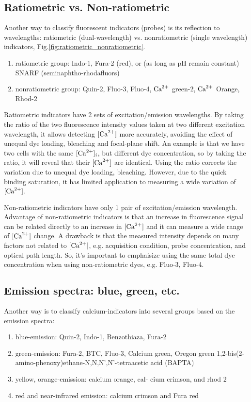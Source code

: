 \subsection{Ratiometric vs. Non-ratiometric}


Another way to classify fluorescent indicators (probes) is its reflection to
wavelengths: ratiometric (dual-wavelength) vs. nonratiometric (single
wavelength) indicators, Fig.\ref{fig:ratiometric_nonratiometric}.

\begin{enumerate}
  \item ratiometric group: Indo-1, Fura-2 (red),  or
  (as long as pH remain constant) SNARF (seminaphtho-rhodafluors)
  \item nonratiometric group: Quin-2, Fluo-3, Fluo-4, ${\text{Ca}^{2+}}$ green-2, ${\text{Ca}^{2+}}$
  Orange, Rhod-2
\end{enumerate}
Ratiometric indicators have 2 sets of excitation/emission wavelengths. By taking the ratio
of the two fluorescence intensity values taken at two different excitation
wavelength, it allows detecting $[{\text{Ca}^{2+}}]$ more accurately, avoiding the effect of
unequal dye loading, bleaching and focal-plane shift. An example is that we have
two cells with the same $[{\text{Ca}^{2+}}]_i$, but different dye concentration, so by taking
the ratio, it will reveal that their $[{\text{Ca}^{2+}}]$ are identical. Using the ratio
corrects the variation due to unequal dye loading, bleaching. However, due to
the quick binding saturation, it has limited application to measuring a wide
variation of $[{\text{Ca}^{2+}}]$.

Non-ratiometric indicators have only 1 pair of excitation/emission wavelength.
Advantage of non-ratiometric indicators is that an increase in fluorescence
signal can be related directly to an increase in $[{\text{Ca}^{2+}}]$ and it can measure a
wide range of $[{\text{Ca}^{2+}}]$ change. A drawback is that the measured intensity depends
on many factors not related to $[{\text{Ca}^{2+}}]$, e.g.
acquisition condition, probe concentration, and optical path length. So, it's
important to emphaisize using the same total dye concentration when using
non-ratiometric dyes, e.g. Fluo-3, Fluo-4.

\subsection{Emission spectra: blue, green, etc.}

Another way is to classify calcium-indicators into several groups
based on the emission spectra:
\begin{enumerate}
  \item blue-emission: Quin-2, Indo-1, Benzothiaza, Fura-2
  \item green-emission: Fura-2, BTC, Fluo-3, Calcium green, Oregon green
  1,2-bis(2-amino-phenoxy)ethane-N,N,N',N'-tetraacetic acid (BAPTA)
  \item yellow, orange-emission: calcium orange, cal- cium crimson, and rhod 2
  \item red and near-infrared emission: calcium crimson and Fura red
\end{enumerate}

